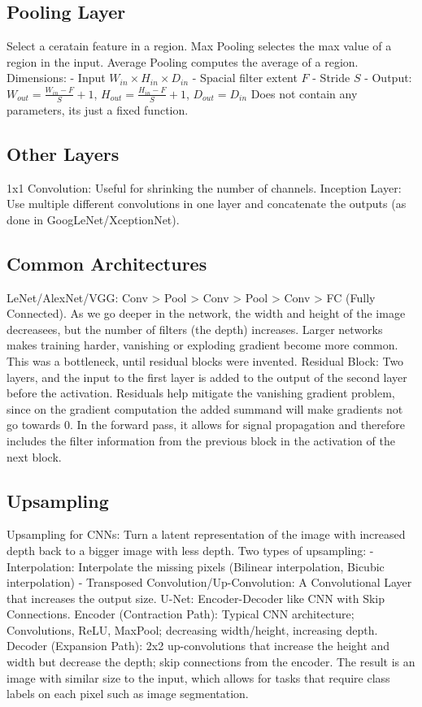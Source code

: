 \documentclass{scrartcl}
\begin{document}
\subsection*{Pooling Layer}
Select a ceratain feature in a region. Max Pooling selectes the max value of a region in the input. Average Pooling computes the average of a region.
Dimensions:
- Input $W_{in} \times H_{in} \times D_{in}$
- Spacial filter extent $F$
- Stride $S$
- Output: $W_{out} = \frac{W_{in} - F}{S} + 1$, $H_{out} = \frac{H_{in} - F}{S} + 1$, $D_{out} = D_{in}$
Does not contain any parameters, its just a fixed function.

\subsection*{Other Layers}
1x1 Convolution: Useful for shrinking the number of channels.
Inception Layer: Use multiple different convolutions in one layer and concatenate the outputs (as done in GoogLeNet/XceptionNet).

\subsection*{Common Architectures}
LeNet/AlexNet/VGG: Conv > Pool > Conv > Pool > Conv > FC (Fully Connected).
As we go deeper in the network, the width and height of the image decreasees, but the number of filters (the depth) increases.
Larger networks makes training harder, vanishing or exploding gradient become more common. This was a bottleneck, until residual blocks were invented.
Residual Block: Two layers, and the input to the first layer is added to the output of the second layer before the activation. Residuals help mitigate the vanishing gradient problem, since on the gradient computation the added summand will make gradients not go towards 0. In the forward pass, it allows for signal propagation and therefore includes the filter information from the previous block in the activation of the next block.

\subsection*{Upsampling}
Upsampling for CNNs: Turn a latent representation of the image with increased depth back to a bigger image with less depth.
Two types of upsampling:
- Interpolation: Interpolate the missing pixels (Bilinear interpolation, Bicubic interpolation)
- Transposed Convolution/Up-Convolution: A Convolutional Layer that increases the output size.
U-Net: Encoder-Decoder like CNN with Skip Connections.
Encoder (Contraction Path): Typical CNN architecture; Convolutions, ReLU, MaxPool; decreasing width/height, increasing depth.
Decoder (Expansion Path): 2x2 up-convolutions that increase the height and width but decrease the depth; skip connections from the encoder.
The result is an image with similar size to the input, which allows for tasks that require class labels on each pixel such as image segmentation.
\end{document}
